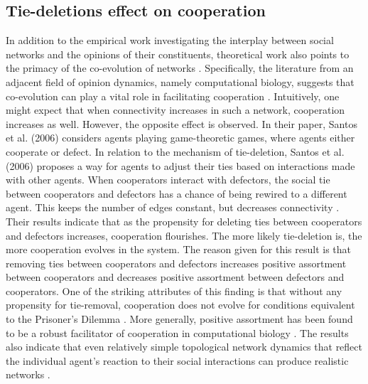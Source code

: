 \documentclass{article}
\begin{document}
\subsection{Tie-deletions effect on cooperation}
In addition to the empirical work investigating the interplay between social networks and the opinions of their constituents, theoretical work also points to the primacy of the co-evolution of networks \cite{holme_nonequilibrium_2006}. Specifically, the literature from an adjacent field of opinion dynamics, namely computational biology, suggests that co-evolution can play a vital role in facilitating cooperation \cite{dakin_dynamic_2018,melamed_strong_2016,pepper_mechanism_2002,santos_cooperation_2006}. Intuitively, one might expect that when connectivity increases in such a network, cooperation increases as well. However, the opposite effect is observed. In their paper, Santos et al. (2006) considers agents playing game-theoretic games, where agents either cooperate or defect. In relation to the mechanism of tie-deletion, Santos et al. (2006) proposes a way for agents to adjust their ties based on interactions made with other agents. When cooperators interact with defectors, the social tie between cooperators and defectors has a chance of being rewired to a different agent. This keeps the number of edges constant, but decreases connectivity \cite{santos_cooperation_2006}. Their results indicate that as the propensity for deleting ties between cooperators and defectors increases, cooperation flourishes. The more likely tie-deletion is, the more cooperation evolves in the system. The reason given for this result is that removing ties between cooperators and defectors increases positive assortment between cooperators and decreases positive assortment between defectors and cooperators. One of the striking attributes of this finding is that without any propensity for tie-removal, cooperation does not evolve for conditions equivalent to the Prisoner’s Dilemma \cite{santos_cooperation_2006}. More generally, positive assortment has been found to be a robust facilitator of cooperation in computational biology \cite{boyd_coordinated_2010,dakin_dynamic_2018,melamed_strong_2016,pepper_mechanism_2002}. The results also indicate that even relatively simple topological network dynamics that reflect the individual agent’s reaction to their social interactions can produce realistic networks \cite{santos_cooperation_2006}. 
\end{document}
